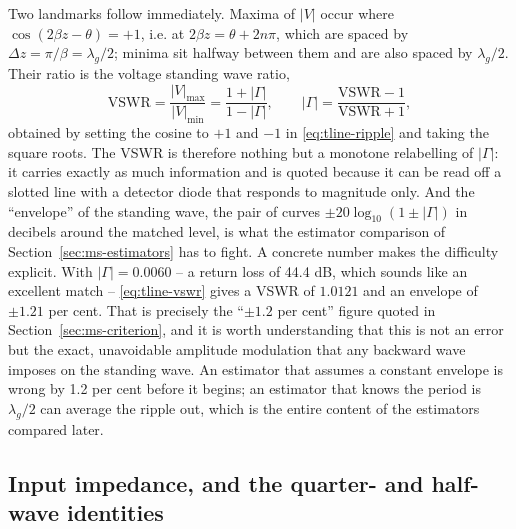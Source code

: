 Two landmarks follow immediately. Maxima of $|V|$ occur where $\cos(2\beta z-\theta)=+1$, i.e. at
$2\beta z = \theta + 2n\pi$, which are spaced by $\Delta z=\pi/\beta=\lambda_g/2$; minima sit halfway between
them and are also spaced by $\lambda_g/2$. Their ratio is the voltage standing wave ratio,
\begin{equation}
  \mathrm{VSWR} = \frac{|V|_{\max}}{|V|_{\min}}
               = \frac{1+|\Gamma|}{1-|\Gamma|} ,
  \qquad |\Gamma| = \frac{\mathrm{VSWR}-1}{\mathrm{VSWR}+1},
  \label{eq:tline-vswr}
\end{equation}
obtained by setting the cosine to $+1$ and $-1$ in \eqref{eq:tline-ripple} and taking the square roots. The
VSWR is therefore nothing but a monotone relabelling of $|\Gamma|$: it carries exactly as much information and
is quoted because it can be read off a slotted line with a detector diode that responds to magnitude only. And
the ``envelope'' of the standing wave, the pair of curves $\pm 20\log_{10}(1\pm|\Gamma|)$ in decibels around the
matched level, is what the estimator comparison of Section~\ref{sec:ms-estimators} has to fight. A concrete
number makes the difficulty explicit. With $|\Gamma|=0.0060$ -- a return loss of 44.4 dB, which sounds like an
excellent match -- \eqref{eq:tline-vswr} gives a VSWR of $1.0121$ and an envelope of $\pm1.21$ per cent. That is
precisely the ``$\pm1.2$ per cent'' figure quoted in Section~\ref{sec:ms-criterion}, and it is worth
understanding that this is not an error but the exact, unavoidable amplitude modulation that any backward wave
imposes on the standing wave. An estimator that assumes a constant envelope is wrong by 1.2 per cent before it
begins; an estimator that knows the period is $\lambda_g/2$ can average the ripple out, which is the entire
content of the estimators compared later.

\subsection{Input impedance, and the quarter- and half-wave identities}
\label{sec:tline-zin}

